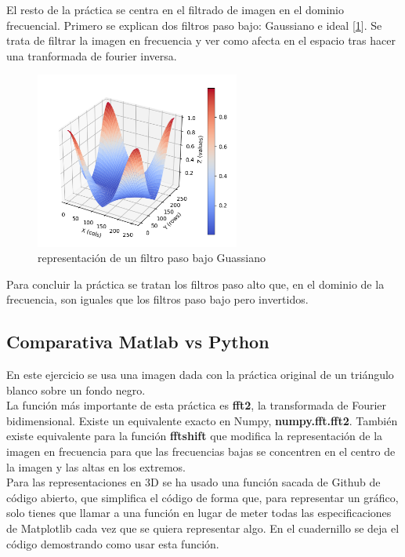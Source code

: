\documentclass[a4paper,12pt]{report}
\begin{document}
El resto de la práctica se centra en el filtrado de imagen en el dominio frecuencial. Primero se explican dos filtros paso bajo: Gaussiano e ideal [\ref {gauss}]. Se trata de filtrar la imagen en frecuencia y ver como afecta en el espacio tras hacer una tranformada de fourier inversa.
\begin{figure}[h]
\centering
\includegraphics[width=0.6\textwidth]{imagenes/gaussfpb}
\caption{representación de un filtro paso bajo Guassiano}
\label{gauss}
\end{figure}
 Para concluir la práctica se tratan los filtros paso alto que, en el dominio de la frecuencia, son iguales que los filtros paso bajo pero invertidos.
\subsection{Comparativa Matlab vs Python}

En este ejercicio se usa una imagen dada con la práctica original de un triángulo blanco sobre un fondo negro.\\

La función más importante de esta práctica es \textbf{fft2}, la transformada de Fourier bidimensional. Existe un equivalente exacto en Numpy,  \textbf{numpy.fft.fft2}. También existe equivalente para la función \textbf{fftshift} que modifica la representación de la imagen en frecuencia para que las frecuencias bajas se concentren en el centro de la imagen y las altas en los extremos.\\

Para las representaciones en 3D se ha usado una función sacada de Github de código abierto, que simplifica el código de forma que, para representar un gráfico, solo tienes que llamar a una función en lugar de meter todas las especificaciones de Matplotlib cada vez que se quiera representar algo. En el cuadernillo se deja el código demostrando como usar esta función.\\
\end{document}
